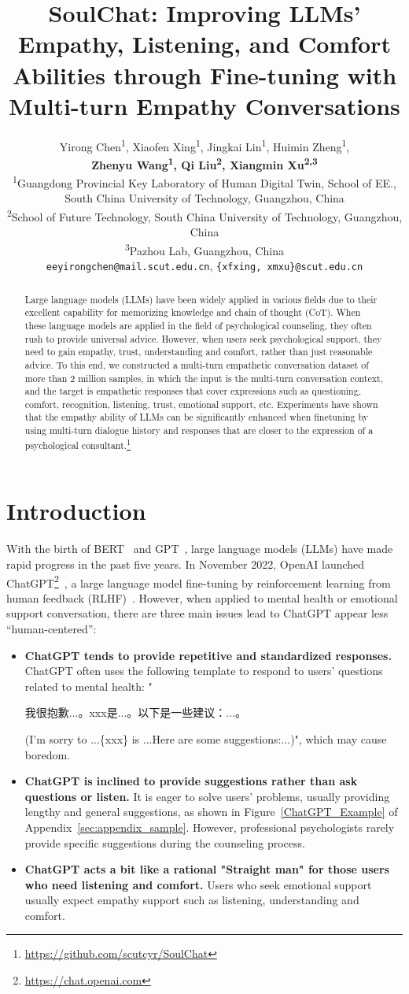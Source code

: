 \documentclass[11pt]{article}
\title{SoulChat: Improving LLMs' Empathy, Listening, and Comfort Abilities through Fine-tuning with Multi-turn Empathy Conversations}
\author{
    Yirong Chen\textsuperscript{1}, Xiaofen Xing\textsuperscript{1}\Thanks{ Corresponding author. Email: xfxing@scut.edu.cn}, Jingkai Lin\textsuperscript{1}, Huimin Zheng\textsuperscript{1}, \\
    {\bf Zhenyu Wang\textsuperscript{1}, Qi Liu\textsuperscript{2}, Xiangmin Xu\textsuperscript{2,3}} \\
  \textsuperscript{1}Guangdong Provincial Key Laboratory of Human Digital Twin, School of EE., \\ South China University of Technology, Guangzhou, China \\
  \textsuperscript{2}School of Future Technology, South China University of Technology, Guangzhou, China \\
  \textsuperscript{3}Pazhou Lab, Guangzhou, China \\
  \texttt{eeyirongchen@mail.scut.edu.cn}, 
  \texttt{\{xfxing, xmxu\}@scut.edu.cn} \\
 }
\begin{document}
\maketitle
\begin{abstract}
Large language models (LLMs) have been widely applied in various fields due to their excellent capability for memorizing knowledge and chain of thought (CoT). When these language models are applied in the field of psychological counseling, they often rush to provide universal advice. However, when users seek psychological support, they need to gain empathy, trust, understanding and comfort, rather than just reasonable advice. To this end, we constructed a multi-turn empathetic conversation dataset of more than 2 million samples, in which the input is the multi-turn conversation context, and the target is empathetic responses that cover expressions such as questioning, comfort, recognition, listening, trust, emotional support, etc. Experiments have shown that the empathy ability of LLMs can be significantly enhanced when finetuning by using multi-turn dialogue history and responses that are closer to the expression of a psychological consultant.\footnote{\url{https://github.com/scutcyr/SoulChat}}
\end{abstract}

\section{Introduction}
With the birth of BERT~\citep{devlin-etal-2019-bert} and GPT~\citep{radford2018improving}, large language models (LLMs) have made rapid progress in the past five years. In November 2022, OpenAI launched ChatGPT\footnote{\url{https://chat.openai.com}}~\citep{chatgpt}, a large language model fine-tuning by reinforcement learning from human feedback (RLHF)~\citep{instructgpt}. However, when applied to mental health or emotional support conversation, there are three main issues lead to ChatGPT appear less ``human-centered'':
\begin{itemize}
  \item [1)]
  \textbf{ChatGPT tends to provide repetitive and standardized responses.} ChatGPT often uses the following template to respond to users' questions related to mental health: "\begin{CJK}{UTF8}{gbsn}我很抱歉...。xxx是...。以下是一些建议：...。\end{CJK} (I'm sorry to ...\{xxx\} is ...Here are some suggestions:...)", which may cause boredom.
  \item [2)]
  \textbf{ChatGPT is inclined to provide suggestions rather than ask questions or listen.} It is eager to solve users' problems, usually providing lengthy and general suggestions, as shown in Figure~\ref{ChatGPT_Example} of Appendix~\ref{sec:appendix_sample}. However, professional psychologists rarely provide specific suggestions during the counseling process.
  \item [3)]
  \textbf{ChatGPT acts a bit like a rational "Straight man" for those users who need listening and comfort.}  Users who seek emotional support usually expect empathy support such as listening, understanding and comfort.
\end{itemize}
\end{document}

